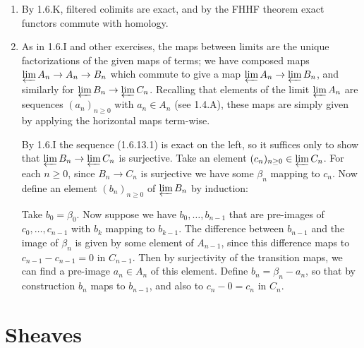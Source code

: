\documentclass{report}
\newcommand{\limit}{\varprojlim} %
\begin{document}
\begin{enumerate}[label=\textbf{1.6.\Alph*.}]
	\item By 1.6.K, filtered colimits are exact, and by the FHHF theorem exact
	      functors commute with homology.

	\item As in 1.6.I and other exercises, the maps between limits are the
	      unique factorizations of the given maps of terms; we have composed
	      maps $\limit A_n\to A_n\to B_n$ which commute to give a map
	      $\limit A_n\to\limit B_n$, and similarly for
	      $\limit B_n\to\limit C_n$. Recalling that elements of the limit
	      $\limit A_n$ are sequences $(a_n)_{n\ge0}$ with $a_n\in A_n$ (see
	      1.4.A), these maps are simply given by applying the horizontal maps
	      term-wise.

	      By 1.6.I the sequence (1.6.13.1) is exact on the left, so it suffices
	      only to show that $\limit B_n\to\limit C_n$ is surjective. Take an
	      element $(c_n)_{n\ge0}\in\limit C_n$. For each $n\ge0$, since
	      $B_n\to C_n$ is surjective we have some $\beta_n$ mapping to $c_n$. Now
	      define an element $(b_n)_{n\ge0}$ of $\limit B_n$ by induction:

	      Take $b_0=\beta_0$. Now suppose we have $b_0,\ldots,b_{n-1}$ that are
	      pre-images of $c_0,\ldots,c_{n-1}$ with $b_k$ mapping to $b_{k-1}$.
	      The difference between $b_{n-1}$ and the image of $\beta_n$ is given
	      by some element of $A_{n-1}$, since this difference maps to
	      $c_{n-1}-c_{n-1}=0$ in $C_{n-1}$. Then by surjectivity of the
	      transition maps, we can find a pre-image $a_n\in A_n$ of this element.
	      Define $b_n=\beta_n-a_n$, so that by construction $b_n$ maps to
	      $b_{n-1}$, and also to $c_n-0=c_n$ in $C_n$.
\end{enumerate}

\chapter{Sheaves}
\end{document}
